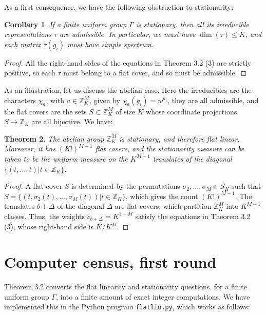 \documentclass[12pt]{amsart}
\newtheorem{theorem}{Theorem}[section]
\newtheorem{corollary}[theorem]{Corollary}
\theoremstyle{definition}
\begin{document}
As a first consequence, we have the following obstruction to stationarity:

\begin{corollary}
If a finite uniform group $\Gamma$ is stationary, then all its irreducible representations $\tau$ are admissible. In particular, we must have $\dim(\tau)\leq K$, and each matrix $\tau(g_i)$ must have simple spectrum.
\end{corollary}

\begin{proof}
All the right-hand sides of the equations in Theorem 3.2 (3) are strictly positive, so each $\tau$ must belong to a flat cover, and so must be admissible.
\end{proof}

As an illustration, let us discuss the abelian case. Here the irreducibles are the characters $\chi_a$, with $a\in\mathbb Z_K^M$, given by $\chi_a(g_i)=w^{a_i}$, they are all admissible, and the flat covers are the sets $S\subset\mathbb Z_K^M$ of size $K$ whose coordinate projections $S\to\mathbb Z_K$ are all bijective. We have:

\begin{theorem}
The abelian group $\mathbb Z_K^M$ is stationary, and therefore flat linear. Moreover, it has $(K!)^{M-1}$ flat covers, and the stationarity measure can be taken to be the uniform measure on the $K^{M-1}$ translates of the diagonal $\{(t,\ldots,t)|t\in\mathbb Z_K\}$.
\end{theorem}

\begin{proof}
A flat cover $S$ is determined by the permutations $\sigma_2,\ldots,\sigma_M\in S_K$ such that $S=\{(t,\sigma_2(t),\ldots,\sigma_M(t))|t\in\mathbb Z_K\}$, which gives the count $(K!)^{M-1}$. The translates $b+\Delta$ of the diagonal $\Delta$ are flat covers, which partition $\mathbb Z_K^M$ into $K^{M-1}$ classes. Thus, the weights $c_{b+\Delta}=K^{1-M}$ satisfy the equations in Theorem 3.2 (3), whose right-hand side is $K/K^M$.
\end{proof}

\section{Computer census, first round}

Theorem 3.2 converts the flat linearity and stationarity questions, for a finite uniform group $\Gamma$, into a finite amount of exact integer computations. We have implemented this in the Python program {\tt flatlin.py}, which works as follows:
\end{document}
